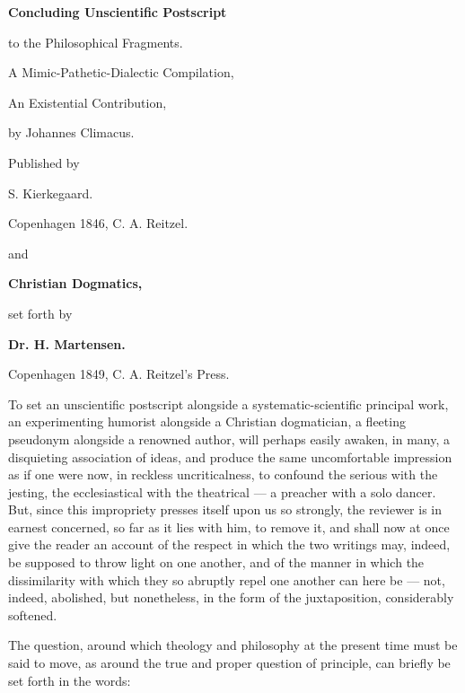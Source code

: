 \documentclass[12pt]{book}
\begin{document}
\begin{center}
{\large\bfseries Concluding Unscientific Postscript\par}
{\large to the Philosophical Fragments.\par}
\vspace{0.35em}
{A Mimic-Pathetic-Dialectic Compilation,\par}
{An Existential Contribution,\par}
{by Johannes Climacus.\par}
\vspace{0.35em}
{\small Published by\par}
{S. Kierkegaard.\par}
\vspace{0.2em}
{\small Copenhagen 1846, C. A. Reitzel.\par}
\vspace{0.9em}
{and\par}
\vspace{0.9em}
{\large\bfseries Christian Dogmatics,\par}
{set forth by\par}
{\bfseries Dr. H. Martensen.\par}
\vspace{0.2em}
{\small Copenhagen 1849, C. A. Reitzel's Press.\par}
\end{center}

To set an unscientific postscript alongside a systematic-scientific principal work, an experimenting humorist alongside a Christian dogmatician, a fleeting pseudonym alongside a renowned author, will perhaps easily awaken, in many, a disquieting association of ideas, and produce the same uncomfortable impression as if one were now, in reckless uncriticalness, to confound the serious with the jesting, the ecclesiastical with the theatrical --- a preacher with a solo dancer. But, since this impropriety presses itself upon us so strongly, the reviewer is in earnest concerned, so far as it lies with him, to remove it, and shall now at once give the reader an account of the respect in which the two writings may, indeed, be supposed to throw light on one another, and of the manner in which the dissimilarity with which they so abruptly repel one another can here be --- not, indeed, abolished, but nonetheless, in the form of the juxtaposition, considerably softened.

The question, around which theology and philosophy at the present time must be said to move, as around the true and proper question of principle, can briefly be set forth in the words:
\end{document}
